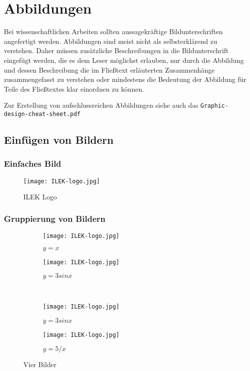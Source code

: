 \chapter{Abbildungen}
\label{sec:tikz}

Bei wissenschaftlichen Arbeiten sollten aussagekräftige Bildunterschriften angefertigt werden. Abbildungen sind meist nicht als selbsterklärend zu verstehen. Daher müssen zusätzliche Beschreibungen in die Bildunterschrift eingefügt werden, die es dem Leser möglichst erlauben, nur durch die Abbildung und dessen Beschreibung die im Fließtext erläuterten Zusammenhänge zusammengefasst zu verstehen oder mindestens die Bedeutung der Abbildung für Teile des Fließtextes klar einordnen zu können.

Zur Erstellung von aufschlussreichen Abbildungen siehe auch das \verb!Graphic-design-cheat-sheet.pdf!

\section{Einfügen von Bildern}
\label{sec:graf}

\subsection{Einfaches Bild}

\begin{figure}[H]
  \centering  
  	\texttt{[image: ILEK-logo.jpg]}
  \caption{ILEK Logo}
  \label{fig:05_starwars}
\end{figure}

\subsection{Gruppierung von Bildern}

\begin{figure}[H]
	\centering
	\begin{subfigure}[b]{0.3\textwidth}
		\centering
		\texttt{[image: ILEK-logo.jpg]}
		\caption{$y=x$}
		\label{fig:05_a}
	\end{subfigure}
\hspace{1cm}
	\begin{subfigure}[b]{0.3\textwidth}
		\centering
		\texttt{[image: ILEK-logo.jpg]}
		\caption{$y=3sinx$}
		\label{fig:05_b}
	\end{subfigure}
	\\ 
	\begin{subfigure}[b]{0.3\textwidth}
		\centering
		\texttt{[image: ILEK-logo.jpg]}
		\caption{$y=3sinx$}
		\label{fig:05_c}
	\end{subfigure}
\hspace{1cm}
	\begin{subfigure}[b]{0.3\textwidth}
		\centering
		\texttt{[image: ILEK-logo.jpg]}
		\caption{$y=5/x$}
		\label{fig:05_five over x}
	\end{subfigure}
	\caption{Vier Bilder}
	\label{fig:05_d}
\end{figure}

